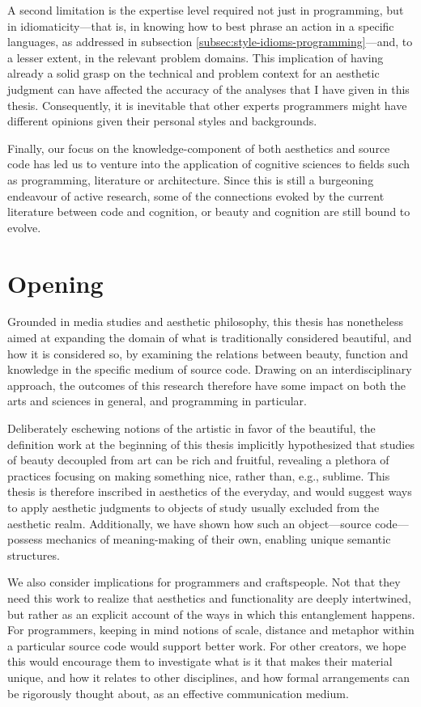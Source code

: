 A second limitation is the expertise level required not just in programming, but in idiomaticity—that is, in knowing how to best phrase an action in a specific languages, as addressed in subsection \ref{subsec:style-idioms-programming}—and, to a lesser extent, in the relevant problem domains. This implication of having already a solid grasp on the technical and problem context for an aesthetic judgment can have affected the accuracy of the analyses that I have given in this thesis. Consequently, it is inevitable that other experts programmers might have different opinions given their personal styles and backgrounds.

Finally, our focus on the knowledge-component of both aesthetics and source code has led us to venture into the application of cognitive sciences to fields such as programming, literature or architecture. Since this is still a burgeoning endeavour of active research,  some of the connections evoked by the current literature between code and cognition, or beauty and cognition are still bound to evolve.

\section{Opening}
\label{sec:opening}

Grounded in media studies and aesthetic philosophy, this thesis has nonetheless aimed at expanding the domain of what is traditionally considered beautiful, and how it is considered so, by examining the relations between beauty, function and knowledge in the specific medium of source code. Drawing on an interdisciplinary approach, the outcomes of this research therefore have some impact  on both the arts and sciences in general, and programming in particular.

Deliberately eschewing notions of the artistic in favor of the beautiful, the definition work at the beginning of this thesis implicitly hypothesized that studies of beauty decoupled from art can be rich and fruitful, revealing a plethora of practices focusing on making something nice, rather than, e.g., sublime. This thesis is therefore inscribed in aesthetics of the everyday, and would suggest ways to apply aesthetic judgments to objects of study usually excluded from the aesthetic realm. Additionally, we have shown how such an object—source code—possess mechanics of meaning-making of their own, enabling unique semantic structures.

We also consider implications for programmers and craftspeople. Not that they need this work to realize that aesthetics and functionality are deeply intertwined, but rather as an explicit account of the ways in which this entanglement happens. For programmers, keeping in mind notions of scale, distance and metaphor within a particular source code would support better work. For other creators, we hope this would encourage them to investigate what is it that makes their material unique, and how it relates to other disciplines, and how formal arrangements  can be rigorously thought about, as an effective communication medium.

